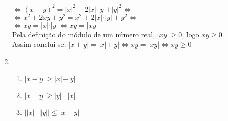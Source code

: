 \documentclass[10pt]{book}
\begin{document}
\begin{enumerate}
		$\Leftrightarrow (x+y)^2 = \vert x \vert^2+2\vert x \vert\cdot\vert y \vert+ \vert y \vert^2 \Leftrightarrow $\\
		$\Leftrightarrow x^2+2xy+y^2 = x^2 +2\vert x \vert\cdot\vert y \vert+ y^2 \Leftrightarrow $\\
		$\Leftrightarrow xy = \vert x \vert\cdot\vert y \vert \Leftrightarrow xy= \vert xy \vert$\\
		Pela definição do módulo de um número real, $\vert xy \vert \geq 0$, logo $xy \geq 0$.\\
		Assim conclui-se: $\vert x + y \vert = \vert x \vert + \vert y \vert \Leftrightarrow xy= \vert xy \vert \Leftrightarrow xy \geq 0$
		\item %
			\begin{enumerate}
				\item %
				$\vert x - y \vert \geq \vert x\vert - \vert y\vert$
				\item %
				$\vert x - y \vert \geq \vert y\vert - \vert x\vert$
				\item %
				$\vert \vert x \vert - \vert y \vert \vert \leq \vert x - y\vert$
			\end{enumerate}
\end{enumerate}
\end{document}
